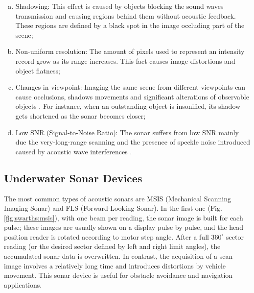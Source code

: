 \documentclass[final,5p,times]{elsarticle}
\begin{document}
\begin{enumerate}[(a)]
    \item Shadowing: This effect is caused by objects blocking the sound waves transmission and causing regions behind them without acoustic feedback. These regions are defined by a black spot in the image occluding part of the scene;
    \item Non-uniform resolution: The amount of pixels used to represent an intensity record grow as its range increases. This fact causes image distortions and object flatness;
    \item Changes in viewpoint: Imaging the same scene from different viewpoints can cause occlusions, shadows movements and significant alterations of observable objects \cite{hurtos2014}. For instance, when an outstanding object is insonified, its shadow gets shortened as the sonar becomes closer;
    \item Low SNR (Signal-to-Noise Ratio): The sonar suffers from low SNR mainly due the very-long-range scanning and the presence of speckle noise introduced caused by acoustic wave interferences \cite{abbott1973}.
\end{enumerate}


\subsection{Underwater Sonar Devices}
\label{sonar:devices}

The most common types of acoustic sonars are MSIS (Mechanical Scanning Imaging Sonar) and FLS (Forward-Looking Sonar). In the first one (Fig. \ref{fig:swarths:msis}), with one beam per reading, the sonar image is built for each pulse; these images are usually shown on a display pulse by pulse, and the head position reader is rotated according to motor step angle. After a full $360^{\circ}$ sector reading (or the desired sector defined by left and right limit angles), the accumulated sonar data is overwritten. In contrast, the acquisition of a scan image involves a relatively long time and introduces distortions by vehicle movement. This sonar device is useful for obstacle avoidance \cite{ganesan2015} and navigation \cite{ribas2010} applications.
\end{document}
